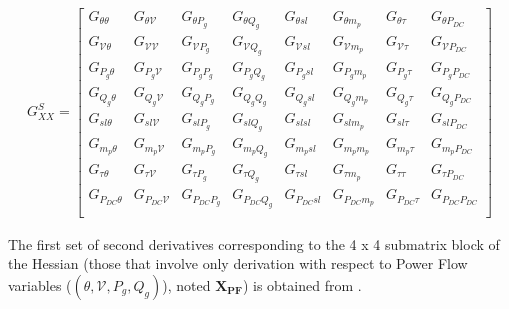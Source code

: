 \begin{equation}
    \begin{split}
        G^S_{XX} =
    \begin{bmatrix}
        G_{\theta\theta} & G_{\theta\mathcal{V}} & G_{\theta P_g} & G_{\theta Q_g} & G_{\theta sl} & G_{\theta m_p} & G_{\theta \tau} & G_{\theta P_{DC}} \\
        G_{\mathcal{V}\theta} & G_{\mathcal{V}\mathcal{V}} & G_{\mathcal{V}P_g} & G_{\mathcal{V}Q_g} & G_{\mathcal{V}sl} & G_{\mathcal{V}m_p} & G_{\mathcal{V}\tau} & G_{\mathcal{V}P_{DC}} \\
        G_{P_g\theta} & G_{P_g\mathcal{V}} & G_{P_gP_g} & G_{P_gQ_g} & G_{P_gsl} & G_{P_gm_p} & G_{P_g\tau} & G_{P_gP_{DC}} \\
        G_{Q_g\theta} & G_{Q_g\mathcal{V}} & G_{Q_gP_g} & G_{Q_gQ_g} & G_{Q_gsl} & G_{Q_gm_p} & G_{Q_g\tau} & G_{Q_gP_{DC}} \\
        G_{sl\theta} & G_{sl\mathcal{V}} & G_{slP_g} & G_{slQ_g} & G_{slsl} & G_{slm_p} & G_{sl\tau} & G_{slP_{DC}} \\
        G_{m_p\theta} & G_{m_p\mathcal{V}} & G_{m_pP_g} & G_{m_pQ_g} & G_{m_psl} & G_{m_pm_p} & G_{m_p\tau} & G_{m_pP_{DC}} \\
        G_{\tau\theta} & G_{\tau \mathcal{V}} & G_{\tau P_g} & G_{\tau Q_g} & G_{\tau sl} & G_{\tau m_p} & G_{\tau\tau} & G_{\tau P_{DC}} \\
        G_{P_{DC}\theta} & G_{P_{DC}\mathcal{V}} & G_{P_{DC}P_g} & G_{P_{DC}Q_g} & G_{P_{DC}sl} & G_{P_{DC}m_p} & G_{P_{DC}\tau} & G_{P_{DC}P_{DC}} \\
    \end{bmatrix}
    \end{split}
    \end{equation}


The first set of second derivatives corresponding to the 4 x 4 submatrix block of the Hessian (those that involve only derivation with respect to Power Flow variables ($(\theta, \mathcal{V}, P_g, Q_g)$), noted $\bm{X_{PF}}$) 
is obtained from \cite{zimmermanTN2}. 

